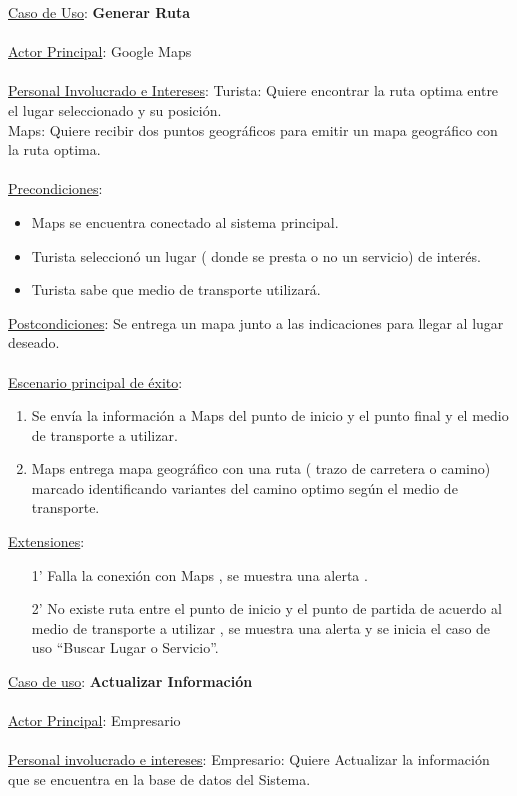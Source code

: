 \documentclass[12pt]{article}
\begin{document}
\underline{Caso de Uso}: \textbf{Generar Ruta}\\\\
\underline{Actor Principal}: Google Maps\\\\
\underline{Personal Involucrado e Intereses}: Turista: Quiere encontrar la ruta optima entre el lugar seleccionado y su posición.\\Maps: Quiere recibir dos puntos geográficos para emitir un mapa geográfico con la ruta optima.\\\\
\underline{Precondiciones}:
\begin{itemize}
\item Maps se encuentra conectado al sistema principal.
\item Turista seleccionó un lugar ( donde se presta o no un servicio) de interés.
\item Turista sabe que medio de transporte utilizará.
\end{itemize}
\underline{Postcondiciones}: Se entrega un mapa junto a las indicaciones para llegar al lugar deseado.\\\\
\underline{Escenario principal de éxito}:
\begin{enumerate}
\item Se envía la información a Maps del punto de inicio y el punto final y el medio de transporte a utilizar.
\item Maps entrega mapa geográfico con una ruta ( trazo de carretera o camino) marcado identificando variantes del camino optimo según el medio de transporte.
\end{enumerate}
\underline{Extensiones}:
\begin{enumerate}
\item[1'] Falla la conexión con Maps , se muestra una alerta .
\item[2'] No existe ruta entre el punto de inicio y el punto de partida de acuerdo al medio de transporte a utilizar , se muestra una alerta y se inicia el caso de uso “Buscar Lugar o Servicio”.
\end{enumerate}
\underline{Caso de uso}: \textbf{Actualizar Información}\\\\
\underline{Actor Principal}: Empresario\\\\
\underline{Personal involucrado e intereses}: Empresario: Quiere Actualizar la información que se encuentra en la base de datos del Sistema.\\
\end{document}
